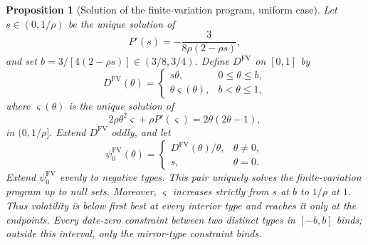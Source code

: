 \documentclass[12pt]{article}
\newtheorem{prop}{Proposition}
\begin{document}
\begin{prop}[Solution of the finite-variation program, uniform case]
\label{prop:app-fv-structure}
Let \(s\in(0,1/\rho)\) be the unique solution of
\begin{equation}\label{eq:app-s-eq}
  P'(s)=-\frac{3}{8\rho(2-\rho s)},
\end{equation}
and set \(b=3/[4(2-\rho s)]\in(3/8,3/4)\). Define \(D^{\mathrm{FV}}\) on
\([0,1]\) by
\[
  D^{\mathrm{FV}}(\theta)=
  \begin{cases}
    s\theta,&0\leq\theta\leq b,\\
    \theta\varsigma(\theta),&b<\theta\leq1,
  \end{cases}
\]
where \(\varsigma(\theta)\) is the unique solution of
\begin{equation}\label{eq:app-shoulder}
  2\rho\theta^2\varsigma+\rho P'(\varsigma)
  =2\theta(2\theta-1),
\end{equation}
in \((0,1/\rho]\). Extend \(D^{\mathrm{FV}}\) oddly, and let
\[
  \psi_0^{\mathrm{FV}}(\theta)=
  \begin{cases}
    D^{\mathrm{FV}}(\theta)/\theta,&\theta\ne0,\\
    s,&\theta=0.
  \end{cases}
\]
Extend \(\psi_0^{\mathrm{FV}}\) evenly to negative types.
This pair uniquely solves the finite-variation program up to null sets.
Moreover, \(\varsigma\) increases strictly from \(s\) at \(b\) to
\(1/\rho\) at \(1\). Thus volatility is below first best at every interior
type and reaches it only at the endpoints. Every date-zero constraint
between two distinct types in \([-b,b]\) binds; outside this interval, only
the mirror-type constraint binds. %
\end{prop}
\end{document}
